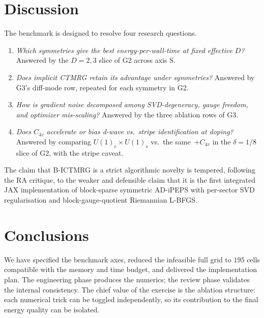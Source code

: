 \documentclass[aps,prb,reprint,amsmath,amssymb,floatfix]{revtex4-2}
\begin{document}
\section{Discussion}

The benchmark is designed to resolve four research questions.
\begin{enumerate}
\item \emph{Which symmetries give the best energy-per-wall-time at fixed effective $D$?} Answered by the $D=2,3$ slice of G2 across axis S.
\item \emph{Does implicit CTMRG retain its advantage under symmetries?} Answered by G3's diff-mode row, repeated for each symmetry in G2.
\item \emph{How is gradient noise decomposed among SVD-degeneracy, gauge freedom, and optimizer mis-scaling?} Answered by the three ablation rows of G3.
\item \emph{Does $C_{4v}$ accelerate or bias d-wave vs.\ stripe identification at doping?} Answered by comparing $U(1)_c\!\times\! U(1)_s$ vs.\ the same~$+C_{4v}$ in the $\delta=1/8$ slice of G2, with the stripe caveat.
\end{enumerate}
The claim that B-ICTMRG is a strict algorithmic novelty is tempered, following the RA critique, to the weaker and defensible claim that it is the first integrated JAX implementation of block-sparse symmetric AD-iPEPS with per-sector SVD regularisation and block-gauge-quotient Riemannian L-BFGS.

\section{Conclusions}

We have specified the benchmark axes, reduced the infeasible full grid to $195$ cells compatible with the memory and time budget, and delivered the implementation plan. The engineering phase produces the numerics; the review phase validates the internal consistency. The chief value of the exercise is the ablation structure: each numerical trick can be toggled independently, so its contribution to the final energy quality can be isolated.
\end{document}
